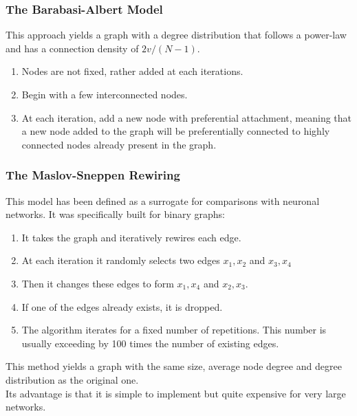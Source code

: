 \subsubsection{The Barabasi-Albert Model}
This approach yields a graph with a degree distribution that follows a power-law and has a connection
density of \(2v/(N-1)\).
\begin{enumerate}
    \item Nodes are not fixed, rather added at each iterations.
    \item Begin with a few interconnected nodes.
    \item At each iteration, add a new node with preferential attachment, meaning that a new node added
          to the graph will be preferentially connected to highly connected nodes already present in the
          graph.
\end{enumerate}
\subsubsection{The Maslov-Sneppen Rewiring}
This model has been defined as a surrogate for comparisons with neuronal networks. It was specifically
built for binary graphs:
\begin{enumerate}
    \item It takes the graph and iteratively rewires each edge.
    \item At each iteration it randomly selects two edges \({x_1,x_2}\) and \({x_3,x_4}\)
    \item Then it changes these edges to form \({x_1,x_4}\) and \({x_2,x_3}\).
    \item If one of the edges already exists, it is dropped.
    \item The algorithm iterates for a fixed number of repetitions. This number is usually exceeding by
          100 times the number of existing edges.
\end{enumerate}
This method yields a graph with the same size, average node degree and degree distribution as the original one.\\
Its advantage is that it is simple to implement but quite expensive for very large networks.

